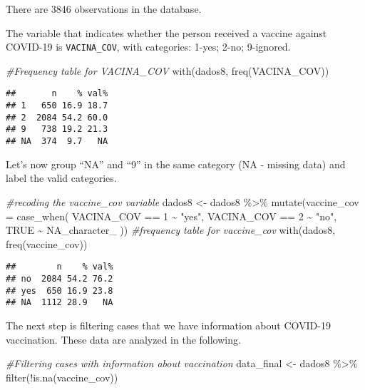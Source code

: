 \documentclass[
]{article}
\newenvironment{Shaded}{\begin{snugshade}}{\end{snugshade}}
\newcommand{\AttributeTok}[1]{\textcolor[rgb]{0.77,0.63,0.00}{#1}}
\newcommand{\CommentTok}[1]{\textcolor[rgb]{0.56,0.35,0.01}{\textit{#1}}}
\newcommand{\ConstantTok}[1]{\textcolor[rgb]{0.00,0.00,0.00}{#1}}
\newcommand{\DecValTok}[1]{\textcolor[rgb]{0.00,0.00,0.81}{#1}}
\newcommand{\FunctionTok}[1]{\textcolor[rgb]{0.00,0.00,0.00}{#1}}
\newcommand{\NormalTok}[1]{#1}
\newcommand{\OtherTok}[1]{\textcolor[rgb]{0.56,0.35,0.01}{#1}}
\newcommand{\SpecialCharTok}[1]{\textcolor[rgb]{0.00,0.00,0.00}{#1}}
\newcommand{\StringTok}[1]{\textcolor[rgb]{0.31,0.60,0.02}{#1}}
\begin{document}
There are 3846 observations in the database.

The variable that indicates whether the person received a vaccine
against COVID-19 is \texttt{VACINA\_COV}, with categories: 1-yes; 2-no;
9-ignored.

\begin{Shaded}
\begin{Highlighting}[]
\CommentTok{\#Frequency table for VACINA\_COV}
\FunctionTok{with}\NormalTok{(dados8, }\FunctionTok{freq}\NormalTok{(VACINA\_COV))}
\end{Highlighting}
\end{Shaded}

\begin{verbatim}
##       n    % val%
## 1   650 16.9 18.7
## 2  2084 54.2 60.0
## 9   738 19.2 21.3
## NA  374  9.7   NA
\end{verbatim}

Let's now group ``NA'' and ``9'' in the same category (NA - missing
data) and label the valid categories.

\begin{Shaded}
\begin{Highlighting}[]
\CommentTok{\#recoding the vaccine\_cov variable }
\NormalTok{dados8 }\OtherTok{\textless{}{-}}\NormalTok{ dados8 }\SpecialCharTok{\%\textgreater{}\%} 
  \FunctionTok{mutate}\NormalTok{(}\AttributeTok{vaccine\_cov =} \FunctionTok{case\_when}\NormalTok{(}
\NormalTok{    VACINA\_COV }\SpecialCharTok{==} \DecValTok{1} \SpecialCharTok{\textasciitilde{}} \StringTok{"yes"}\NormalTok{, }
\NormalTok{    VACINA\_COV }\SpecialCharTok{==} \DecValTok{2} \SpecialCharTok{\textasciitilde{}} \StringTok{"no"}\NormalTok{,}
    \ConstantTok{TRUE} \SpecialCharTok{\textasciitilde{}} \ConstantTok{NA\_character\_}
\NormalTok{  ))}
\CommentTok{\#frequency table for vaccine\_cov}
\FunctionTok{with}\NormalTok{(dados8, }\FunctionTok{freq}\NormalTok{(vaccine\_cov))}
\end{Highlighting}
\end{Shaded}

\begin{verbatim}
##        n    % val%
## no  2084 54.2 76.2
## yes  650 16.9 23.8
## NA  1112 28.9   NA
\end{verbatim}

The next step is filtering cases that we have information about COVID-19
vaccination. These data are analyzed in the following.

\begin{Shaded}
\begin{Highlighting}[]
\CommentTok{\#Filtering cases with information about vaccination}
\NormalTok{data\_final }\OtherTok{\textless{}{-}}\NormalTok{ dados8 }\SpecialCharTok{\%\textgreater{}\%} 
  \FunctionTok{filter}\NormalTok{(}\SpecialCharTok{!}\FunctionTok{is.na}\NormalTok{(vaccine\_cov))}
\end{Highlighting}
\end{Shaded}
\end{document}
